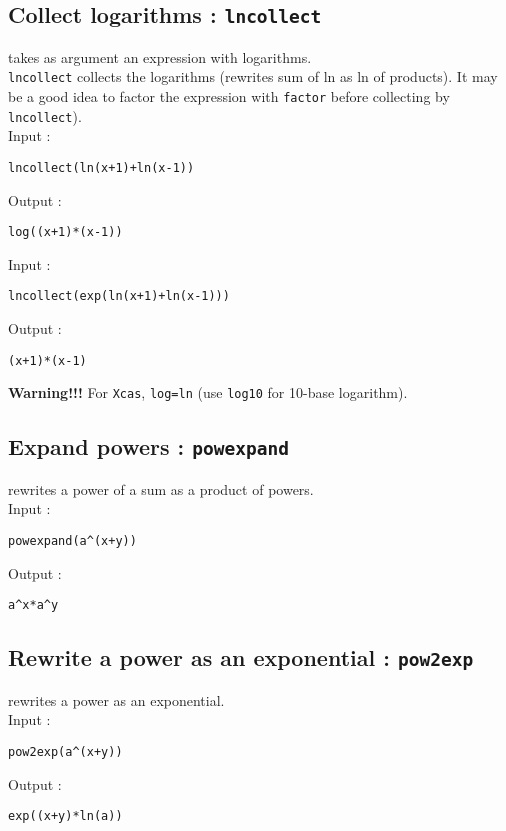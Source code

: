 \documentclass[a4paper,11pt]{book}
\begin{document}
\subsection{Collect logarithms : {\tt lncollect}}
 takes as argument an expression with logarithms.\\
{\tt lncollect} collects the logarithms (rewrites sum of ln
as ln of products). 
It may be a good idea to factor the 
expression with {\tt factor} before collecting by {\tt lncollect}).\\
Input :
\begin{center}{\tt lncollect(ln(x+1)+ln(x-1))}\end{center}
Output :
\begin{center}{\tt log((x+1)*(x-1))}\end{center}
Input :
\begin{center}{\tt lncollect(exp(ln(x+1)+ln(x-1)))}\end{center}
Output :
\begin{center}{\tt (x+1)*(x-1)}\end{center}
{\bf Warning!!!}  For {\tt Xcas}, {\tt log=ln} (use {\tt log10}
for 10-base logarithm).

\subsection{Expand powers : {\tt powexpand}}
 rewrites a power of a sum as a product of powers.\\
Input :
\begin{center}{\tt powexpand(a\verb|^|(x+y))}\end{center}
Output :
\begin{center}{\tt a\verb|^|x*a\verb|^|y}\end{center}


\subsection{Rewrite a power as an exponential : {\tt pow2exp}}
 rewrites a power as an exponential.\\
Input :
\begin{center}{\tt  pow2exp(a\verb|^|(x+y))}\end{center}
Output :
\begin{center}{\tt exp((x+y)*ln(a))}\end{center}
\end{document}
